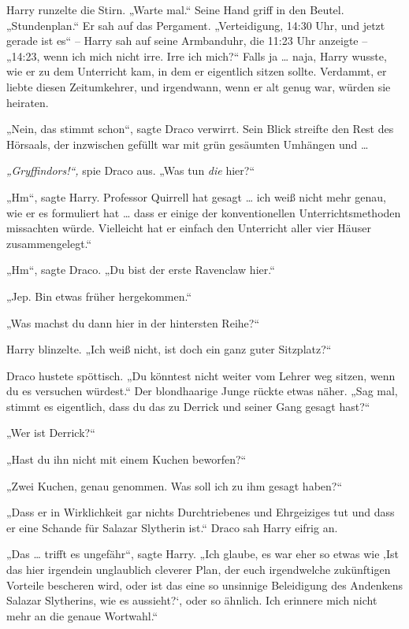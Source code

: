 {Harry runzelte die Stirn. „Warte mal.“ Seine Hand griff in den Beutel. „Stundenplan.“ Er sah auf das Pergament. „Verteidigung, 14:30 Uhr, und jetzt gerade ist es“ -- Harry sah auf seine Armbanduhr, die 11:23 Uhr anzeigte -- „14:23, wenn ich mich nicht irre. Irre ich mich?“ Falls ja … naja, Harry wusste, wie er zu dem Unterricht kam, in dem er eigentlich sitzen sollte. Verdammt, er liebte diesen Zeitumkehrer, und irgendwann, wenn er alt genug war, würden sie heiraten.

„Nein, das stimmt schon“, sagte Draco verwirrt. Sein Blick streifte den Rest des Hörsaals, der inzwischen gefüllt war mit grün gesäumten Umhängen und …

\emph{„Gryffindors!“,} spie Draco aus. „Was tun \emph{die} hier?“

„Hm“, sagte Harry. Professor Quirrell hat gesagt … ich weiß nicht mehr genau, wie er es formuliert hat … dass er einige der konventionellen Unterrichtsmethoden missachten würde. Vielleicht hat er einfach den Unterricht aller vier Häuser zusammengelegt.“

„Hm“, sagte Draco. „Du bist der erste Ravenclaw hier.“

„Jep. Bin etwas früher hergekommen.“

„Was machst du dann hier in der hintersten Reihe?“

Harry blinzelte. „Ich weiß nicht, ist doch ein ganz guter Sitzplatz?“

Draco hustete spöttisch. „Du könntest nicht weiter vom Lehrer weg sitzen, wenn du es versuchen würdest.“ Der blondhaarige Junge rückte etwas näher. „Sag mal, stimmt es eigentlich, dass du das zu Derrick und seiner Gang gesagt hast?“

„Wer ist Derrick?“

„Hast du ihn nicht mit einem Kuchen beworfen?“

„Zwei Kuchen, genau genommen. Was soll ich zu ihm gesagt haben?“

„Dass er in Wirklichkeit gar nichts Durchtriebenes und Ehrgeiziges tut und dass er eine Schande für Salazar Slytherin ist.“ Draco sah Harry eifrig an.

„Das … trifft es ungefähr“, sagte Harry. „Ich glaube, es war eher so etwas wie ‚Ist das hier irgendein unglaublich cleverer Plan, der euch irgendwelche zukünftigen Vorteile bescheren wird, oder ist das eine so unsinnige Beleidigung des Andenkens Salazar Slytherins, wie es aussieht?`, oder so ähnlich. Ich erinnere mich nicht mehr an die genaue Wortwahl.“

}
